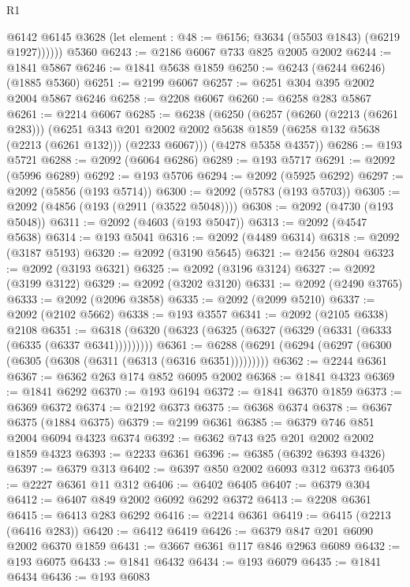 \begin{lexlean}{R1}
\begin{coremodule}
            @6142
            @6145
            @3628
            (let element : @48 := @6156; @3634 (@5503 @1843) (@6219 @1927))))))
    @5360
@6243 := @2186 @6067 @733 @825 @2005 @2002
@6244 := @1841 @5867
@6246 := @1841 @5638 @1859
@6250 := @6243 (@6244 @6246) (@1885 @5360)
@6251 := @2199 @6067
@6257 := @6251 @304 @395 @2002 @2004 @5867 @6246
@6258 := @2208 @6067
@6260 := @6258 @283 @5867
@6261 := @2214 @6067
@6285 := @6238
    (@6250
      (@6257
        (@6260 (@2213 (@6261 @283)))
        (@6251
          @343
          @201
          @2002
          @2002
          @5638
          @1859
          (@6258 @132 @5638 (@2213 (@6261 @132)))
          (@2233 @6067)))
      (@4278 @5358 @4357))
@6286 := @193 @5721
@6288 := @2092 (@6064 @6286)
@6289 := @193 @5717
@6291 := @2092 (@5996 @6289)
@6292 := @193 @5706
@6294 := @2092 (@5925 @6292)
@6297 := @2092 (@5856 (@193 @5714))
@6300 := @2092 (@5783 (@193 @5703))
@6305 := @2092 (@4856 (@193 (@2911 (@3522 @5048))))
@6308 := @2092 (@4730 (@193 @5048))
@6311 := @2092 (@4603 (@193 @5047))
@6313 := @2092 (@4547 @5638)
@6314 := @193 @5041
@6316 := @2092 (@4489 @6314)
@6318 := @2092 (@3187 @5193)
@6320 := @2092 (@3190 @5645)
@6321 := @2456 @2804
@6323 := @2092 (@3193 @6321)
@6325 := @2092 (@3196 @3124)
@6327 := @2092 (@3199 @3122)
@6329 := @2092 (@3202 @3120)
@6331 := @2092 (@2490 @3765)
@6333 := @2092 (@2096 @3858)
@6335 := @2092 (@2099 @5210)
@6337 := @2092 (@2102 @5662)
@6338 := @193 @3557
@6341 := @2092 (@2105 @6338) @2108
@6351 := @6318 (@6320 (@6323 (@6325 (@6327 (@6329 (@6331 (@6333 (@6335 (@6337 @6341)))))))))
@6361 := @6288 (@6291 (@6294 (@6297 (@6300 (@6305 (@6308 (@6311 (@6313 (@6316 @6351)))))))))
@6362 := @2244 @6361
@6367 := @6362 @263 @174 @852 @6095 @2002
@6368 := @1841 @4323
@6369 := @1841 @6292
@6370 := @193 @6194
@6372 := @1841 @6370 @1859
@6373 := @6369 @6372
@6374 := @2192 @6373
@6375 := @6368 @6374
@6378 := @6367 @6375 (@1884 @6375)
@6379 := @2199 @6361
@6385 := @6379 @746 @851 @2004 @6094 @4323 @6374
@6392 := @6362 @743 @25 @201 @2002 @2002 @1859 @4323
@6393 := @2233 @6361
@6396 := @6385 (@6392 @6393 @4326)
@6397 := @6379 @313
@6402 := @6397 @850 @2002 @6093 @312 @6373
@6405 := @2227 @6361 @11 @312
@6406 := @6402 @6405
@6407 := @6379 @304
@6412 := @6407 @849 @2002 @6092 @6292 @6372
@6413 := @2208 @6361
@6415 := @6413 @283 @6292
@6416 := @2214 @6361
@6419 := @6415 (@2213 (@6416 @283))
@6420 := @6412 @6419
@6426 := @6379 @847 @201 @6090 @2002 @6370 @1859
@6431 := @3667 @6361 @117 @846 @2963 @6089
@6432 := @193 @6075
@6433 := @1841 @6432
@6434 := @193 @6079
@6435 := @1841 @6434
@6436 := @193 @6083

\end{coremodule}
\end{lexlean}
